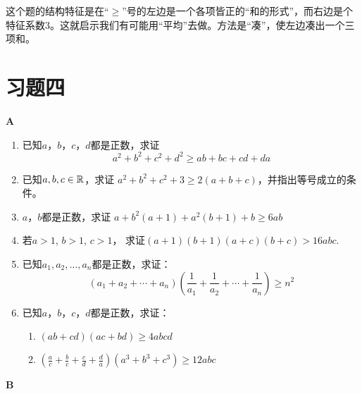 \begin{rmk}
这个题的结构特征是在“$\ge $”号的左边是一个各项皆正的“和的形式”，而右边是个特征系数3。这就启示我们有可能用“平均”去做。方法是“凑”，使左边凑出一个三项和。
\end{rmk}

\section*{习题四}
\begin{center}
    \bfseries A
\end{center}

\begin{enumerate}
    \item 已知$a$，$b$，$c$，$d$都是正数，求证
    \[a^2+b^2+c^2+d^2\ge ab+bc+cd+da\]
    \item 已知$a,b,c\in\mathbb{R}$，求证
    $a^2+b^2+c^2+3\ge 2(a+b+c)$，并指出等号成立的条件。
    \item $a$，$b$都是正数，求证
    $a+b^2(a+1)+a^2(b+1)+b\ge 6ab$
    \item 若$a>1$, $b>1$, $c>1$，
    求证$(a+1)(b+1)(a+c)(b+c)>16abc$.
    \item 已知$a_1,a_2,\ldots, a_n$都是正数，求证：
    \[(a_1+a_2+\cdots +a_n)\left(\frac{1}{a_1}+\frac{1}{a_2}+\cdots+\frac{1}{a_n}\right)\ge n^2\]
    \item 已知$a$，$b$，$c$，$d$都是正数，求证：
    \begin{enumerate}[(1)]
        \item $(ab+cd)(ac+bd)\ge 4abcd$
        \item $\left(\frac{a}{c}+\frac{b}{c}+\frac{c}{d}+\frac{d}{a}\right)(a^3+b^3+c^3)\ge 12abc$
    \end{enumerate}  
\end{enumerate}

\begin{center}
    \bfseries B
\end{center}

